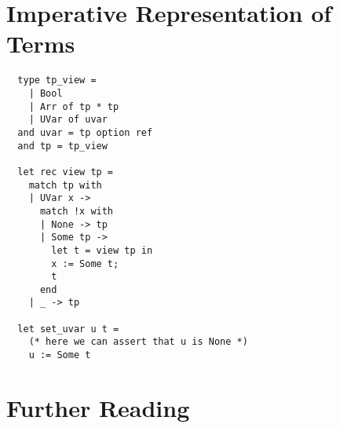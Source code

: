\section{Imperative Representation of Terms}

\begin{verbatim}
  type tp_view = 
    | Bool
    | Arr of tp * tp
    | UVar of uvar
  and uvar = tp option ref
  and tp = tp_view

  let rec view tp = 
    match tp with
    | UVar x ->
      match !x with
      | None -> tp
      | Some tp ->
        let t = view tp in
        x := Some t;
        t
      end
    | _ -> tp

  let set_uvar u t =
    (* here we can assert that u is None *)
    u := Some t
\end{verbatim}

\section{Further Reading}

